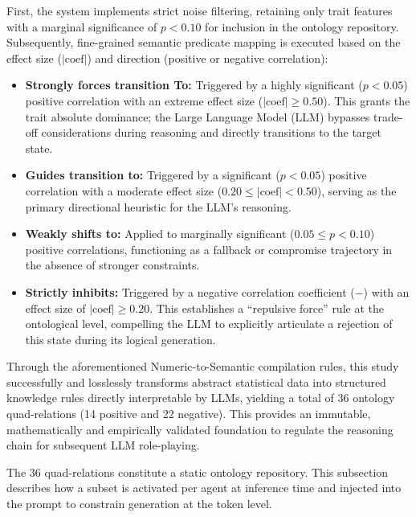 \documentclass[11pt]{article}
\begin{document}
First, the system implements strict noise filtering, retaining only trait features with a marginal significance of $p < 0.10$ for inclusion in the ontology repository. Subsequently, fine-grained semantic predicate mapping is executed based on the effect size ($|\text{coef}|$) and direction (positive or negative correlation):

\begin{itemize}
    \item \textbf{Strongly forces transition To:} Triggered by a highly significant ($p < 0.05$) positive correlation with an extreme effect size ($|\text{coef}| \ge 0.50$). This grants the trait absolute dominance; the Large Language Model (LLM) bypasses trade-off considerations during reasoning and directly transitions to the target state.
    
    \item \textbf{Guides transition to:} Triggered by a significant ($p < 0.05$) positive correlation with a moderate effect size ($0.20 \le |\text{coef}| < 0.50$), serving as the primary directional heuristic for the LLM's reasoning.
    
    \item \textbf{Weakly shifts to:} Applied to marginally significant ($0.05 \le p < 0.10$) positive correlations, functioning as a fallback or compromise trajectory in the absence of stronger constraints.
    
    \item \textbf{Strictly inhibits:} Triggered by a negative correlation coefficient ($-$) with an effect size of $|\text{coef}| \ge 0.20$. This establishes a ``repulsive force'' rule at the ontological level, compelling the LLM to explicitly articulate a rejection of this state during its logical generation.
\end{itemize}

Through the aforementioned Numeric-to-Semantic compilation rules, this study successfully and losslessly transforms abstract statistical data into structured knowledge rules directly interpretable by LLMs, yielding a total of 36 ontology quad-relations (14 positive and 22 negative). This provides an immutable, mathematically and empirically validated foundation to regulate the reasoning chain for subsequent LLM role-playing.

The 36 quad-relations constitute a static ontology repository. This subsection describes how a subset is activated per agent at inference time and injected into the prompt to constrain generation at the token level.
\end{document}
